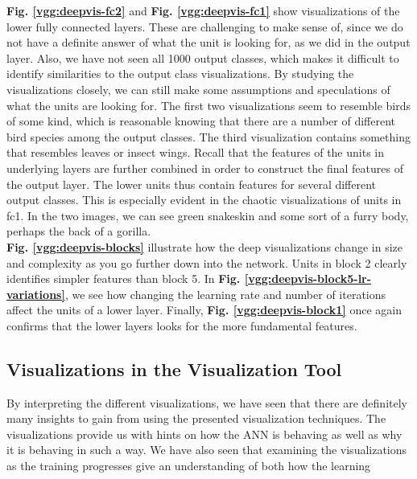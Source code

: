 \noindent \textbf{Fig. \ref{vgg:deepvis-fc2}} and \textbf{Fig. \ref{vgg:deepvis-fc1}} show visualizations of the lower fully connected layers. These are challenging to make sense of, since we do not have a definite answer of what the unit is looking for, as we did in the output layer. Also, we have not seen all 1000 output classes, which makes it difficult to identify similarities to the output class visualizations. By studying the visualizations closely, we can still make some assumptions and speculations of what the units are looking for. The first two visualizations seem to resemble birds of some kind, which is reasonable knowing that there are a number of different bird species among the output classes. The third visualization contains something that resembles leaves or insect wings. Recall that the features of the units in underlying layers are further combined in order to construct the final features of the output layer. The lower units thus contain features for several different output classes. This is especially evident in the chaotic visualizations of units in fc1. In the two images, we can see green snakeskin and some sort of a furry body, perhaps the back of a gorilla. \\ %

\noindent \textbf{Fig. \ref{vgg:deepvis-blocks}} illustrate how the deep visualizations change in size and complexity as you go further down into the network. Units in block 2 clearly identifies simpler features than block 5. In \textbf{Fig. \ref{vgg:deepvis-block5-lr-variations}}, we see how changing the learning rate and number of iterations affect the units of a lower layer. %
Finally, \textbf{Fig. \ref{vgg:deepvis-block1}} once again confirms that the lower layers looks for the more fundamental features.

\subsection{Visualizations in the Visualization Tool}

By interpreting the different visualizations, we have seen that there are definitely many insights to gain from using the presented visualization techniques. The visualizations provide us with hints on how the ANN is behaving as well as why it is behaving in such a way. We have also seen that examining the visualizations as the training progresses give an understanding of both how the learning 

